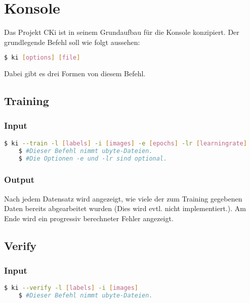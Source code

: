 \section{Konsole}
\label{sec:DesignKonsole}
Das Projekt CKi ist in seinem Grundaufbau für die Konsole konzipiert. Der grundlegende Befehl soll wie folgt aussehen: 
\begin{lstlisting}[language=bash]
	$ ki [options] [file]
\end{lstlisting}
Dabei gibt es drei Formen von diesem Befehl.

\subsection{Training}
\label{sec:DesignTraining} %
\subsubsection{Input}
\label{sec:DesignTraiInput}
\begin{lstlisting}[language=bash]
	$ ki --train -l [labels] -i [images] -e [epochs] -lr [learningrate]
	$ #Dieser Befehl nimmt ubyte-Dateien.
	$ #Die Optionen -e und -lr sind optional.
\end{lstlisting}

\subsubsection{Output}
\label{sec:TraiOutput}
Nach jedem Datensatz wird angezeigt, wie viele der zum Training gegebenen Daten bereits abgearbeitet wurden (Dies wird evtl. nicht implementiert.). Am Ende wird ein progressiv berechneter Fehler angezeigt.

\subsection{Verify}
\label{sec:DesignTest} %
\subsubsection{Input}
\label{sec:DesignTestInput}
\begin{lstlisting}[language=bash]
	$ ki --verify -l [labels] -i [images]
	$ #Dieser Befehl nimmt ubyte-Dateien.
\end{lstlisting}

